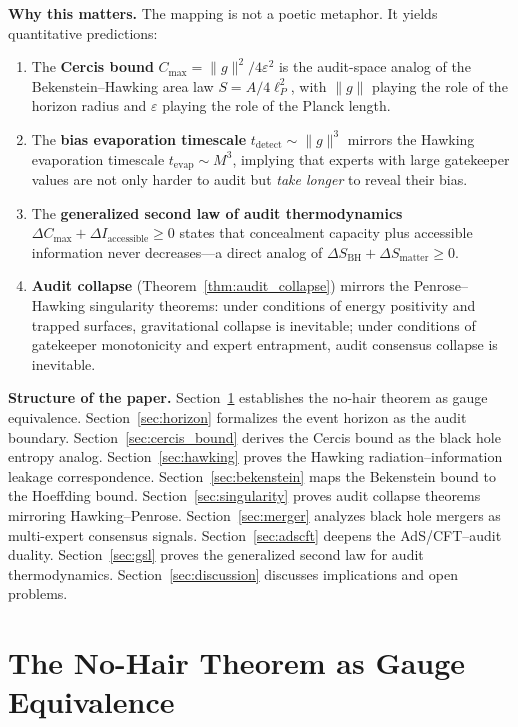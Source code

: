 \documentclass[12pt,a4paper]{article}
\theoremstyle{remark}
\newcommand{\Cercis}{\textsf{Cercis}}
\begin{document}
\medskip
\noindent\textbf{Why this matters.} The mapping is not a poetic metaphor. It yields quantitative predictions:
\begin{enumerate}[leftmargin=*, label=(\arabic*)]
  \item The \textbf{Cercis bound} $C_{\max} = \|g\|^2 / 4\varepsilon^2$ is the audit-space analog of the Bekenstein--Hawking area law $S = A/4\ell_P^2$, with $\|g\|$ playing the role of the horizon radius and $\varepsilon$ playing the role of the Planck length.
  \item The \textbf{bias evaporation timescale} $t_{\text{detect}} \sim \|g\|^3$ mirrors the Hawking evaporation timescale $t_{\text{evap}} \sim M^3$, implying that experts with large gatekeeper values are not only harder to audit but \emph{take longer} to reveal their bias.
  \item The \textbf{generalized second law of audit thermodynamics} $\Delta C_{\max} + \Delta I_{\text{accessible}} \geq 0$ states that concealment capacity plus accessible information never decreases---a direct analog of $\Delta S_{\text{BH}} + \Delta S_{\text{matter}} \geq 0$.
  \item \textbf{Audit collapse} (Theorem~\ref{thm:audit_collapse}) mirrors the Penrose--Hawking singularity theorems: under conditions of energy positivity and trapped surfaces, gravitational collapse is inevitable; under conditions of gatekeeper monotonicity and expert entrapment, audit consensus collapse is inevitable.
\end{enumerate}

\medskip
\noindent\textbf{Structure of the paper.}
Section~\ref{sec:nohair} establishes the no-hair theorem as gauge equivalence.
Section~\ref{sec:horizon} formalizes the event horizon as the audit boundary.
Section~\ref{sec:cercis_bound} derives the \Cercis{} bound as the black hole entropy analog.
Section~\ref{sec:hawking} proves the Hawking radiation--information leakage correspondence.
Section~\ref{sec:bekenstein} maps the Bekenstein bound to the Hoeffding bound.
Section~\ref{sec:singularity} proves audit collapse theorems mirroring Hawking--Penrose.
Section~\ref{sec:merger} analyzes black hole mergers as multi-expert consensus signals.
Section~\ref{sec:adscft} deepens the AdS/CFT--audit duality.
Section~\ref{sec:gsl} proves the generalized second law for audit thermodynamics.
Section~\ref{sec:discussion} discusses implications and open problems.

\section{The No-Hair Theorem as Gauge Equivalence}
\label{sec:nohair}
\end{document}
